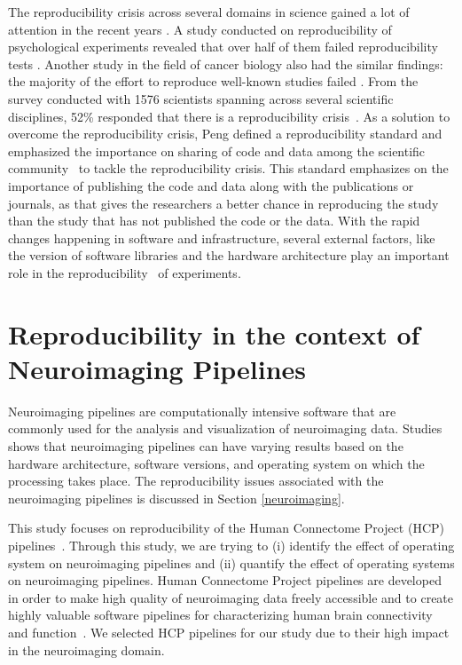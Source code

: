 The reproducibility crisis across several domains in science gained a lot of attention in the recent years 
\cite{aac4716,Begley2012,Button2013,Baker2016,Gla15}. 
A study conducted on reproducibility of psychological experiments 
revealed that over half of them failed reproducibility tests
\cite{aac4716}. Another study in the field of cancer biology also had 
the similar findings: the majority of the effort to reproduce well-known 
studies failed \cite{Begley2012}. From the survey conducted with 1576 
scientists spanning across several scientific disciplines, 52\% 
responded that there is a reproducibility crisis~\cite{Baker2016}. 
As a solution to overcome the reproducibility crisis, Peng defined a reproducibility standard and emphasized 
the importance on sharing of code and data among the scientific 
community~\cite{Peng2011} to tackle the reproducibility  crisis.
This standard emphasizes on the importance of publishing the code and data along with the publications or journals, as that gives
the researchers a better chance in reproducing the study than the study that has not published the code or the data.
With the rapid changes happening in software and infrastructure, several external factors, like 
the version of software libraries and the hardware architecture play an important role in the reproducibility~\cite{10.1371/journal.pone.0038234,Gla15} of experiments.
\section{Reproducibility in the context of Neuroimaging Pipelines}
Neuroimaging pipelines are computationally intensive software that are 
commonly used for the analysis and visualization of neuroimaging data. 
Studies~\cite{10.1371/journal.pone.0038234,Gla15} shows that 
neuroimaging pipelines can have varying results based on the hardware 
architecture, software versions, and operating system on which the 
processing takes place. The reproducibility issues associated with the 
neuroimaging pipelines is discussed in Section \ref{neuroimaging}.

This study focuses on reproducibility of the Human Connectome Project (HCP) pipelines~\cite{Gla13}. 
Through this study, we are trying to (i) identify the effect of operating system on neuroimaging pipelines and (ii) quantify the effect of operating systems on neuroimaging pipelines. 
Human Connectome Project pipelines are developed in order to make high quality of neuroimaging data freely accessible and to create highly valuable software pipelines for characterizing human brain connectivity and function~\cite{VanEssen2013}. 
We selected HCP pipelines for our study due to their high impact in the neuroimaging domain.

